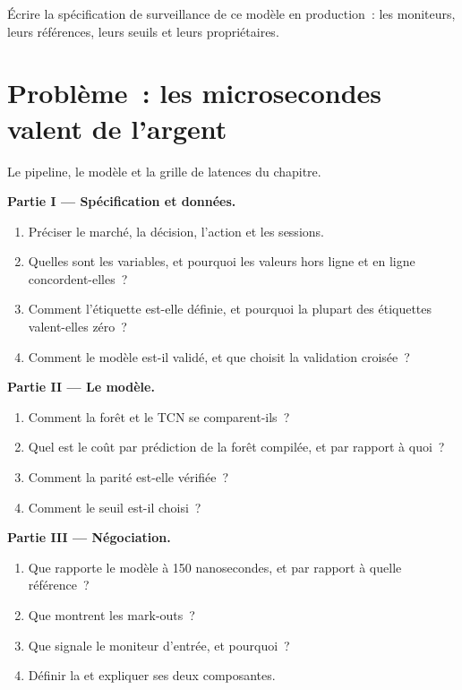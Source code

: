 \begin{exercise}[$\star\star\star$]\label{exo:ml:build-an-order-book-model-end-to-end:8}
Écrire la spécification de surveillance de ce modèle en production~: les moniteurs, leurs références, leurs seuils et leurs propriétaires.
\end{exercise}

\section{Problème~: les microsecondes valent de l'argent}

\begin{problem}\label{pb:ml:build-an-order-book-model-end-to-end:1}
Le pipeline, le modèle et la grille de latences du chapitre.

\medskip\noindent\textbf{Partie I --- Spécification et données.}
\begin{enumerate}
\item Préciser le marché, la décision, l'action et les sessions.
\item Quelles sont les variables, et pourquoi les valeurs hors ligne et en ligne concordent-elles~?
\item Comment l'étiquette est-elle définie, et pourquoi la plupart des étiquettes valent-elles zéro~?
\item Comment le modèle est-il validé, et que choisit la validation croisée~?
\end{enumerate}

\medskip\noindent\textbf{Partie II --- Le modèle.}
\begin{enumerate}[resume]
\item Comment la forêt et le TCN se comparent-ils~?
\item Quel est le coût par prédiction de la forêt compilée, et par rapport à quoi~?
\item Comment la parité est-elle vérifiée~?
\item Comment le seuil est-il choisi~?
\end{enumerate}

\medskip\noindent\textbf{Partie III --- Négociation.}
\begin{enumerate}[resume]
\item Que rapporte le modèle à 150 nanosecondes, et par rapport à quelle référence~?
\item Que montrent les mark-outs~?
\item Que signale le moniteur d'entrée, et pourquoi~?
\item Définir la  et expliquer ses deux composantes.
\end{enumerate}


\end{problem}
